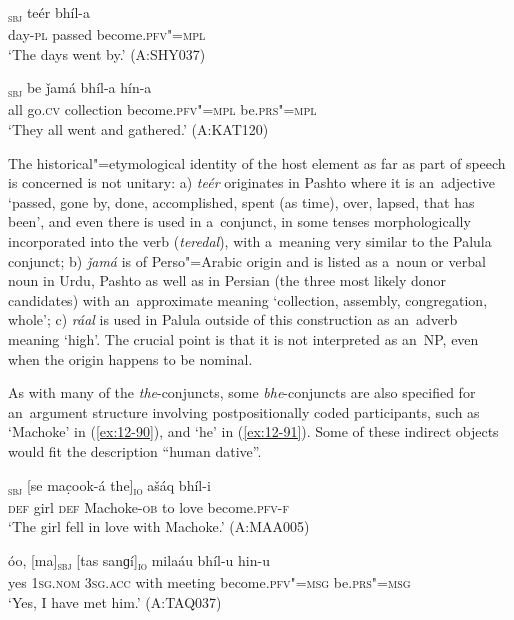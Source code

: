 \begin{exe}
\ex
\label{ex:12-88}
\gll [dees-á]\textsubscript{\textsc{sbj}} teér bhíl-a \\
day-\textsc{pl} passed become.\textsc{pfv"=mpl} \\
\glt `The days went by.' (A:SHY037)
\end{exe}
\begin{exe}
\ex
\label{ex:12-89}
\gll [buṭheé]\textsubscript{\textsc{sbj}} be ǰamá bhíl-a hín-a  \\
all go.\textsc{cv} collection become.\textsc{pfv"=mpl} be.\textsc{prs"=mpl} \\
\glt `They all went and gathered.' (A:KAT120)
\end{exe}

The historical"=etymological identity of the host element as far as part of speech is concerned is not unitary: a) \textit{teér} originates in Pashto where it is an~adjective `passed, gone by, done, accomplished, spent (as time), over, lapsed, that has been', and even there is used in a~conjunct, in some tenses morphologically incorporated into the verb (\textit{teredal}), with a~meaning very similar to the Palula conjunct; b) \textit{ǰamá} is of Perso"=Arabic origin and is listed as a~noun or verbal noun in Urdu, Pashto as well as in Persian (the three most likely donor candidates) with an~approximate meaning `collection, assembly, congregation, whole'; c) \textit{ráal} is used in Palula outside of this construction as an~adverb meaning `high'. The crucial point is that it is not interpreted as an~NP, even when the origin happens to be nominal. 


As with many of the \textit{the}-conjuncts, some \textit{bhe}-conjuncts are also specified for an~argument structure involving postpositionally coded participants, such as `Machoke' in (\ref{ex:12-90}), and `he' in (\ref{ex:12-91}). Some of these indirect objects would fit the description ``human dative''. 

\begin{exe}
\ex
\label{ex:12-90}
\gll [se phaí]\textsubscript{\textsc{sbj}} [se mac̣ook-á the]\textsubscript{\textsc{io}} ašáq bhíl-i \\
\textsc{def} girl \textsc{def} Machoke-\textsc{ob} to love  become.\textsc{pfv-f} \\
\glt `The girl fell in love with Machoke.' (A:MAA005)
\end{exe}
\begin{exe}
\ex
\label{ex:12-91}
\gll óo, [ma]\textsubscript{\textsc{sbj}} [tas sanɡí]\textsubscript{\textsc{io}} milaáu bhíl-u hin-u \\
yes \textsc{1sg.nom} \textsc{3sg.acc} with meeting become.\textsc{pfv"=msg}  be.\textsc{prs"=msg} \\
\glt `Yes, I have met him.' (A:TAQ037)
\end{exe}

